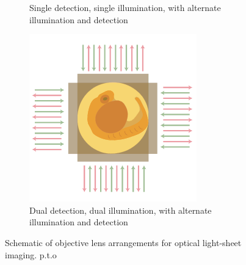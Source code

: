 \begin{figure}
\begin{subfigure}[t]{0.4\textwidth}
        \caption{Single detection, single illumination, with alternate illumination and detection~\cite{kumar_dual-view_2014}}\label{fig:depth/di_spim}
    \end{subfigure}\hspace{0.07\textwidth}
    \begin{subfigure}[t]{0.4\textwidth}
        \centering
        \includegraphics{depth/muvi}
        \caption{Dual detection, dual illumination, with alternate illumination and detection}\label{fig:depth/muvi}
    \end{subfigure}
        \caption[Schematic of objective lens arrangements for optical \gls{light-sheet} imaging]{Schematic of objective lens arrangements for optical \gls{light-sheet} imaging.
        p.t.o}
\end{figure}
